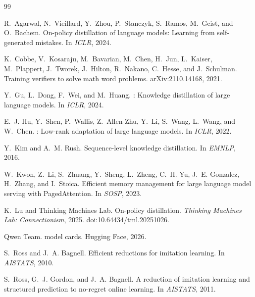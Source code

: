 \documentclass[11pt,a4paper,fontset=none]{ctexart}
\begin{document}
\begin{thebibliography}{99}
\setlength{\itemsep}{1pt}
\small

R.~Agarwal, N.~Vieillard, Y.~Zhou, P.~Stanczyk, S.~Ramos, M.~Geist, and
O.~Bachem.
\newblock On-policy distillation of language models: Learning from
self-generated mistakes.
\newblock In \emph{ICLR}, 2024.

K.~Cobbe, V.~Kosaraju, M.~Bavarian, M.~Chen, H.~Jun, L.~Kaiser, M.~Plappert,
J.~Tworek, J.~Hilton, R.~Nakano, C.~Hesse, and J.~Schulman.
\newblock Training verifiers to solve math word problems.
\newblock arXiv:2110.14168, 2021.

Y.~Gu, L.~Dong, F.~Wei, and M.~Huang.
: Knowledge distillation of large language models.
\newblock In \emph{ICLR}, 2024.

E.~J. Hu, Y.~Shen, P.~Wallis, Z.~Allen-Zhu, Y.~Li, S.~Wang, L.~Wang, and
W.~Chen.
: Low-rank adaptation of large language models.
\newblock In \emph{ICLR}, 2022.

Y.~Kim and A.~M. Rush.
\newblock Sequence-level knowledge distillation.
\newblock In \emph{EMNLP}, 2016.

W.~Kwon, Z.~Li, S.~Zhuang, Y.~Sheng, L.~Zheng, C.~H. Yu, J.~E. Gonzalez,
H.~Zhang, and I.~Stoica.
\newblock Efficient memory management for large language model serving with
{PagedAttention}.
\newblock In \emph{SOSP}, 2023.

K.~Lu and Thinking Machines Lab.
\newblock On-policy distillation.
\newblock \emph{Thinking Machines Lab: Connectionism}, 2025.
\newblock doi:10.64434/tml.20251026.

Qwen Team.
 model cards.
\newblock Hugging Face, 2026.

S.~Ross and J.~A. Bagnell.
\newblock Efficient reductions for imitation learning.
\newblock In \emph{AISTATS}, 2010.

S.~Ross, G.~J. Gordon, and J.~A. Bagnell.
\newblock A reduction of imitation learning and structured prediction to
no-regret online learning.
\newblock In \emph{AISTATS}, 2011.


\end{thebibliography}
\end{document}
